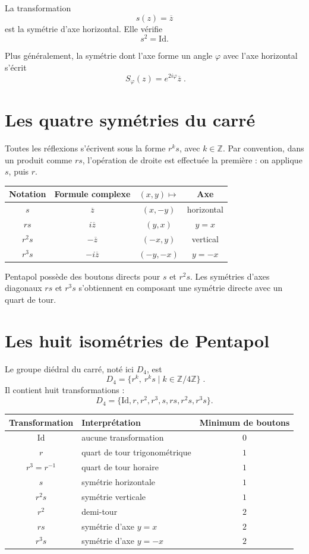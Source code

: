 \documentclass[11pt,a4paper]{article}
\newcommand{\Z}{\mathbb{Z}}
\newcommand{\id}{\mathrm{Id}}
\newcommand{\conj}[1]{\overline{#1}}
\begin{document}
La transformation
\[
  s(z)=\conj z
\]
est la sym\'etrie d'axe horizontal. Elle v\'erifie
\[
  s^2=\id.
\]

Plus g\'en\'eralement, la sym\'etrie dont l'axe forme un angle $\varphi$ avec l'axe horizontal
s'\'ecrit
\[
  \boxed{\;S_{\varphi}(z)=e^{2i\varphi}\conj z\;}.
\]

\section{Les quatre sym\'etries du carr\'e}

Toutes les r\'eflexions s'\'ecrivent sous la forme $r^ks$, avec $k\in\Z$. Par convention, dans
un produit comme $rs$, l'op\'eration de droite est effectu\'ee la premi\`ere : on applique $s$,
puis $r$.

\begin{center}
\begin{tabular}{cccc}
\toprule
Notation & Formule complexe & $(x,y)\mapsto$ & Axe\\
\midrule
$s$ & $\conj z$ & $(x,-y)$ & horizontal\\
$rs$ & $i\conj z$ & $(y,x)$ & $y=x$\\
$r^2s$ & $-\conj z$ & $(-x,y)$ & vertical\\
$r^3s$ & $-i\conj z$ & $(-y,-x)$ & $y=-x$\\
\bottomrule
\end{tabular}
\end{center}

Pentapol poss\`ede des boutons directs pour $s$ et $r^2s$. Les sym\'etries d'axes diagonaux $rs$
et $r^3s$ s'obtiennent en composant une sym\'etrie directe avec un quart de tour.

\section{Les huit isom\'etries de Pentapol}

Le groupe di\'edral du carr\'e, not\'e ici $D_4$, est
\[
  \boxed{\;D_4=\{r^k,\ r^ks\mid k\in\Z/4\Z\}\;}.
\]
Il contient huit transformations :
\[
  D_4=\{\id,r,r^2,r^3,s,rs,r^2s,r^3s\}.
\]

\begin{center}
\begin{tabular}{clc}
\toprule
Transformation & Interpr\'etation & Minimum de boutons\\
\midrule
$\id$ & aucune transformation & $0$\\
$r$ & quart de tour trigonom\'etrique & $1$\\
$r^3=r^{-1}$ & quart de tour horaire & $1$\\
$s$ & sym\'etrie horizontale & $1$\\
$r^2s$ & sym\'etrie verticale & $1$\\
$r^2$ & demi-tour & $2$\\
$rs$ & sym\'etrie d'axe $y=x$ & $2$\\
$r^3s$ & sym\'etrie d'axe $y=-x$ & $2$\\
\bottomrule
\end{tabular}
\end{center}
\end{document}
